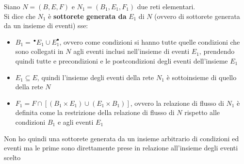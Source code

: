 \documentclass[a4paper,12pt, oneside]{book}
\begin{document}
\begin{definizione}
  Siano $N=(B,E,F)$ e $N_1=(B_1,E_1,F_1)$ due reti elementari.\\
  Si dice che $N_1$ è \textbf{sottorete generata da} $E_1$ di $N$ (ovvero di
  sottorete generata da un insieme di eventi) sse:
  \begin{itemize}
    \item $B_1=\,^\bullet E_1\cup E_1^\bullet$, ovvero come condizioni si
    hanno tutte quelle condizioni che sono collegati in $N$ agli eventi inclusi
    nell'insieme di eventi $E_1$, prendendo quindi tutte e precondizioni e le
    postcondizioni degli eventi dell'insieme $E_1$
    \item $E_1\subseteq E$, quindi l'insieme degli eventi della rete $N_1$
    è sottoinsieme di quello della rete $N$
    \item $F_1=F\cap[(B_1\times E_1)\cup (E_1\times B_1)]$, ovvero la relazione
    di flusso di $N_1$ è definita come la restrizione della relazione di flusso
    di $N$ rispetto alle condizioni $B_1$ e agli eventi $E_1$
  \end{itemize}
  Non ho quindi una sottorete generata da un insieme arbitrario di condizioni ed
  eventi ma le prime sono direttamente prese in relazione all'insieme degli
  eventi scelto
\end{definizione}
\end{document}
